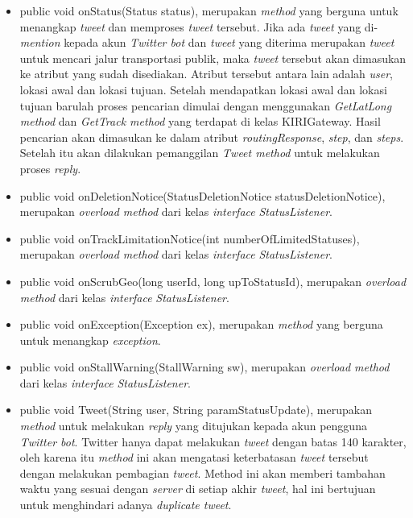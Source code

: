 \begin{itemize}
\begin{itemize}
									\begin{itemize}
												\item public void onStatus(Status status), merupakan \textit{method} yang berguna untuk menangkap \textit{tweet} dan memproses \textit{tweet} tersebut. Jika ada \textit{tweet} yang di-\textit{mention} kepada akun \textit{Twitter bot} dan \textit{tweet} yang diterima merupakan \textit{tweet} untuk mencari jalur transportasi publik, maka \textit{tweet} tersebut akan dimasukan ke atribut yang sudah disediakan. Atribut tersebut antara lain adalah \textit{user}, lokasi awal dan lokasi tujuan. Setelah mendapatkan lokasi awal dan lokasi tujuan barulah proses pencarian dimulai dengan menggunakan \textit{GetLatLong method} dan \textit{GetTrack method} yang terdapat di kelas KIRIGateway. Hasil pencarian akan dimasukan ke dalam atribut \textit{routingResponse}, \textit{step}, dan \textit{steps}. Setelah itu akan dilakukan pemanggilan \textit{Tweet method} untuk melakukan proses \textit{reply}.
												\item public void onDeletionNotice(StatusDeletionNotice statusDeletionNotice), merupakan \textit{overload method} dari kelas \textit{interface} \textit{StatusListener}.
												\item public void onTrackLimitationNotice(int numberOfLimitedStatuses), merupakan \textit{overload method} dari kelas \textit{interface} \textit{StatusListener}.
												\item public void onScrubGeo(long userId, long upToStatusId), merupakan \textit{overload method} dari kelas \textit{interface} \textit{StatusListener}.
												\item public void onException(Exception ex), merupakan \textit{method} yang berguna untuk menangkap \textit{exception}.
												\item public void onStallWarning(StallWarning sw), merupakan \textit{overload method} dari kelas \textit{interface} \textit{StatusListener}.
												\item public void Tweet(String user, String paramStatusUpdate), merupakan \textit{method} untuk melakukan \textit{reply} yang ditujukan kepada akun pengguna \textit{Twitter bot}. Twitter hanya dapat melakukan \textit{tweet} dengan batas 140 karakter, oleh karena itu \textit{method} ini akan mengatasi keterbatasan \textit{tweet} tersebut dengan melakukan pembagian \textit{tweet}. Method ini akan memberi tambahan waktu yang sesuai dengan \textit{server} di setiap akhir \textit{tweet}, hal ini bertujuan untuk menghindari adanya \textit{duplicate tweet}.
									\end{itemize}
				\end{itemize}
		

\end{itemize}
